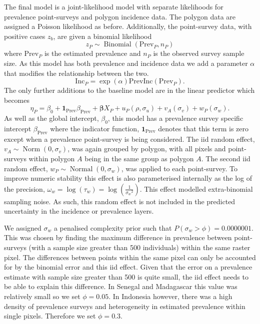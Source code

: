 \documentclass{statsoc}
\begin{document}
The final model is a joint-likelihood model with separate likelihoods for prevalence point-surveys and polygon incidence data.
The polygon data are assigned a Poisson likelihood as before.
Additionally, the point-survey data, with positive cases $z_b$, are given a binomial likelihood
$$z_P \sim \operatorname{Binomial}(\mathrm{Prev}_P, n_P) $$
where $\mathrm{Prev}_P$ is the estimated prevalence and $n_P$ is the observed survey sample size. 
As this model has both prevalence and incidence data we add a parameter $\alpha$ that modifies the relationship between the two.
$$\mathrm{Inc}_P = \exp(\alpha)\mathrm{PrevInc}(\mathrm{Prev}_P).$$
The only further additions to the baseline model are in the linear predictor which becomes 
$$\eta_P = \beta_0 + \mathbf{1}_\mathrm{Prev}\beta_\mathrm{Prev} +  \boldsymbol\beta X_P  + u_P(\rho, \sigma_u) + v_A(\sigma_v) + w_P(\sigma_w).$$
As well as the global intercept, $\beta_0$, this model has a prevalence survey specific intercept $\beta_\mathrm{Prev}$ where the indicator function, $\mathbf{1}_\mathrm{Prev}$ denotes that this term is zero except when a prevalence point-survey is being considered.
The iid random effect, $v_A \sim \operatorname{Norm}(0, \sigma_v)$, was again grouped by polygon, with all pixels and point-surveys within polygon $A$ being in the same group as polygon $A$.
The second iid random effect, $w_P \sim \operatorname{Normal}(0, \sigma_w)$, was applied to each point-survey.
To improve numeric stability this effect is also parameterised internally as the log of the precision, $\omega_w = \log(\tau_w) = \log(\frac{1}{{\sigma_w}^2})$.
This effect modelled extra-binomial sampling noise.
As such, this random effect is not included in the predicted uncertainty in the incidence or prevalence layers.


We assigned $\sigma_w$ a penalised complexity prior such that $P(\sigma_w > \phi) = 0.0000001$. 
This was chosen by finding the maximum difference in prevalence between point-surveys (with a sample size greater than 500 individuals) within the same raster pixel.
The differences between points within the same pixel can only be accounted for by the binomial error and this iid effect.
Given that the error on a prevalence estimate with sample size greater than 500 is quite small, the iid effect needs to be able to explain this difference.
In Senegal and Madagascar this value was relatively small so we set $\phi = 0.05$. 
In Indonesia however, there was a high density of prevalence surveys and heterogeneity in estimated prevalence within single pixels.
Therefore we set $\phi = 0.3$.
\end{document}
